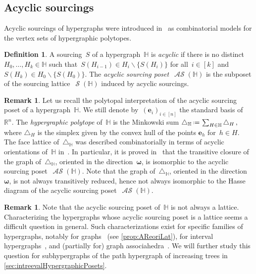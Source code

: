 \documentclass{amsart}
\theoremstyle{definition}
\newtheorem{definition}[theorem]{Definition}
\newtheorem{remark}[theorem]{Remark}
\newcommand{\R}{\mathbb{R}} %
\renewcommand{\b}[1]{\boldsymbol{#1}} %
\newcommand{\ssm}{\smallsetminus} %
\newcommand{\eqdef}{\mbox{\,\raisebox{0.2ex}{\scriptsize\ensuremath{\mathrm:}}\ensuremath{=}\,}} %
\newcommand{\simplex}{\triangle} %
\newcommand{\darkblue}{\color{darkblue}} %
\newcommand{\defn}[1]{\textsl{\darkblue #1}} %
\DeclareMathOperator{\Sour}{\mathcal{S}}  %
\DeclareMathOperator{\ASour}{\mathcal{AS}}  %
\newcommand{\HH}{\mathbb H}  %
\begin{document}

\subsection{Acyclic sourcings}
\label{subsec:acyclicSourcings}

Acyclic sourcings of hypergraphs were introduced in~\cite{BenedettiBergeronMachacek,BergeronPilaud} as combinatorial models for the vertex sets of hypergraphic polytopes.

\begin{definition}
\label{def:ASour}
A sourcing~$S$ of a hypergraph~$\HH$ is \defn{acyclic} if there is no distinct~$H_0, \dots, H_k \in \HH$ such that~$S(H_{i-1}) \in H_i \ssm \{S(H_i)\}$ for all~$i \in [k]$ and~$S(H_k) \in H_0 \ssm \{S(H_0)\}$.
The \defn{acyclic sourcing poset}~$\ASour(\HH)$ is the subposet of the sourcing lattice~$\Sour(\HH)$ induced by acyclic sourcings.
\end{definition}

\begin{remark}
Let us recall the polytopal interpretation of the acyclic sourcing poset of a hypergraph~$\HH$.
We still denote by~$(\b{e}_i)_{i \in [n]}$ the standard basis of~$\R^n$.
The \defn{hypergraphic polytope} of~$\HH$ is the Minkowski sum
\(
\simplex_\HH \eqdef \sum_{H\in \HH} \simplex_H\,,
\)
where $\simplex_H$ is the simplex given by the convex hull of the points $\b{e}_h$ for~$h \in H$.
The face lattice of~$\simplex_\HH$ was described combinatorially in terms of acyclic orientations of~$\HH$ in~\cite{BenedettiBergeronMachacek}.
In particular, it is proved in~\cite{Gelinas} that the transitive closure of the graph of~$\simplex_\HH$, oriented in the direction~$\b{\omega}$, is isomorphic to the acyclic sourcing poset~$\ASour(\HH)$.
Note that the graph of~$\simplex_\HH$, oriented in the direction~$\b{\omega}$, is not always transitively reduced, hence not always isomorphic to the Hasse diagram of the acyclic sourcing poset~$\ASour(\HH)$.
\end{remark}

\begin{remark}
\label{rem:ASourLat}
Note that the acyclic sourcing poset of~$\HH$ is not always a lattice.
Characterizing the hypergraphs whose acyclic sourcing poset is a lattice seems a difficult question in general.
Such characterizations exist for specific families of hypergraphs, notably for graphs~\cite{Pilaud-acyclicReorientationLattices} (see \cref{prop:AReoriLat}), for interval hypergraphs~\cite{BergeronPilaud}, and (partially for) graph associahedra~\cite{BarnardMcConville}.
We will further study this question for subhypergraphs of the path hypergraph of increasing trees in \cref{sec:intreevalHypergraphicPosets}.
\end{remark}
\end{document}
